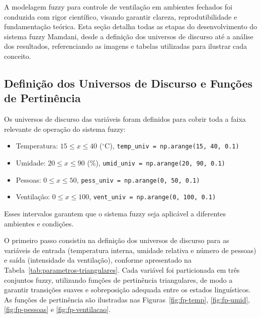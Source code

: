 A modelagem fuzzy para controle de ventilação em ambientes fechados foi conduzida com rigor científico, visando garantir clareza, reprodutibilidade e fundamentação teórica. Esta seção detalha todas as etapas do desenvolvimento do sistema fuzzy Mamdani, desde a definição dos universos de discurso até a análise dos resultados, referenciando as imagens e tabelas utilizadas para ilustrar cada conceito.

\subsection{Definição dos Universos de Discurso e Funções de Pertinência}

Os universos de discurso das variáveis foram definidos para cobrir toda a faixa relevante de operação do sistema fuzzy:

\begin{itemize}
    \item Temperatura: $15 \leq x \leq 40$ ($^\circ$C), \texttt{temp\_univ = np.arange(15, 40, 0.1)}
    \item Umidade: $20 \leq x \leq 90$ (\%), \texttt{umid\_univ = np.arange(20, 90, 0.1)}
    \item Pessoas: $0 \leq x \leq 50$, \texttt{pess\_univ = np.arange(0, 50, 0.1)}
    \item Ventilação: $0 \leq x \leq 100$, \texttt{vent\_univ = np.arange(0, 100, 0.1)}
\end{itemize}

Esses intervalos garantem que o sistema fuzzy seja aplicável a diferentes ambientes e condições.

O primeiro passo consistiu na definição dos universos de discurso para as variáveis de entrada (temperatura interna, umidade relativa e número de pessoas) e saída (intensidade da ventilação), conforme apresentado na Tabela~\ref{tab:parametros-triangulares}. Cada variável foi particionada em três conjuntos fuzzy, utilizando funções de pertinência triangulares, de modo a garantir transições suaves e sobreposição adequada entre os estados linguísticos. As funções de pertinência são ilustradas nas Figuras~\ref{fig:fp-temp}, \ref{fig:fp-umid}, \ref{fig:fp-pessoas} e \ref{fig:fp-ventilacao}.

